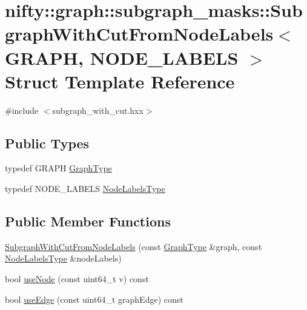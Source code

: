\hypertarget{structnifty_1_1graph_1_1subgraph__masks_1_1SubgraphWithCutFromNodeLabels}{}\section{nifty\+:\+:graph\+:\+:subgraph\+\_\+masks\+:\+:Subgraph\+With\+Cut\+From\+Node\+Labels$<$ G\+R\+A\+P\+H, N\+O\+D\+E\+\_\+\+L\+A\+B\+E\+L\+S $>$ Struct Template Reference}
\label{structnifty_1_1graph_1_1subgraph__masks_1_1SubgraphWithCutFromNodeLabels}


{\ttfamily \#include $<$subgraph\+\_\+with\+\_\+cut.\+hxx$>$}

\subsection*{Public Types}
\begin{DoxyCompactItemize}
\item 
typedef G\+R\+A\+P\+H \hyperlink{structnifty_1_1graph_1_1subgraph__masks_1_1SubgraphWithCutFromNodeLabels_adc4d7dd452a818984b5afc989cc55a19}{Graph\+Type}
\item 
typedef N\+O\+D\+E\+\_\+\+L\+A\+B\+E\+L\+S \hyperlink{structnifty_1_1graph_1_1subgraph__masks_1_1SubgraphWithCutFromNodeLabels_aab0ef05152a0058c18c020c8220ad30f}{Node\+Labels\+Type}
\end{DoxyCompactItemize}
\subsection*{Public Member Functions}
\begin{DoxyCompactItemize}
\item 
\hyperlink{structnifty_1_1graph_1_1subgraph__masks_1_1SubgraphWithCutFromNodeLabels_abc60999bc3d3ba367572a5141062b031}{Subgraph\+With\+Cut\+From\+Node\+Labels} (const \hyperlink{structnifty_1_1graph_1_1subgraph__masks_1_1SubgraphWithCutFromNodeLabels_adc4d7dd452a818984b5afc989cc55a19}{Graph\+Type} \&graph, const \hyperlink{structnifty_1_1graph_1_1subgraph__masks_1_1SubgraphWithCutFromNodeLabels_aab0ef05152a0058c18c020c8220ad30f}{Node\+Labels\+Type} \&node\+Labels)
\item 
bool \hyperlink{structnifty_1_1graph_1_1subgraph__masks_1_1SubgraphWithCutFromNodeLabels_a31ea73ac998792f602c5668bc758ebb8}{use\+Node} (const uint64\+\_\+t v) const 
\item 
bool \hyperlink{structnifty_1_1graph_1_1subgraph__masks_1_1SubgraphWithCutFromNodeLabels_a584976af564b8aafdf38391efe68022e}{use\+Edge} (const uint64\+\_\+t graph\+Edge) const 
\end{DoxyCompactItemize}
